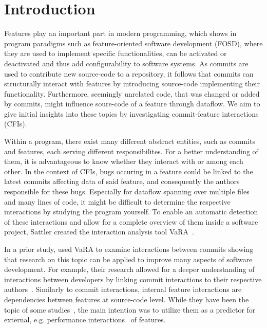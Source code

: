 \chapter{Introduction}\label{ch:introduction}

Features play an important part in modern programming, which shows in program paradigms such as feature-oriented software development (FOSD),
where they are used to implement specific functionalities, can be activated or deactivated and thus add configurability to software systems.
As commits are used to contribute new source-code to a repository, it follows that commits can structurally interact with features by introducing source-code implementing their functionality. 
Furthermore, seemingly unrelated code, that was changed or added by commits, might influence soure-code of a feature through dataflow.
We aim to give initial insights into these topics by investigating commit-feature interactions (CFIs).

Within a program, there exist many different abstract entities, such as commits and features, each serving different responsibilites.
For a better understanding of them, it is advantageous to know whether they interact with or among each other.
In the context of CFIs, bugs occuring in a feature could be linked to the latest commits affecting data of said feature, and consequently the authors responsible for these bugs.
Especially for dataflow spanning over multiple files and many lines of code, it might be difficult to determine the respective interactions by studying the program yourself.
To enable an automatic detection of these interactions and allow for a complete overview of them inside a software project, Sattler created the interaction analysis tool VaRA~\cite{VaRA2023}.

In a prior study, \citet{sattler2023seal} used VaRA to examine interactions between commits showing that research on this topic can be applied to improve many aspects of software development.
For example, their research allowed for a deeper understanding of interactions between developers by linking commit interactions to their respective authors~\cite{sattler2023seal}. 
Similarly to commit interactions, internal feature interactions are dependencies between features at source-code level. 
While they have been the topic of some studies~\cite{kolesnikov2017relation}, the main intention was to utilize them as a predictor for external, e.g. performance interactions~\cite{siegmund2012predicting} of features.

